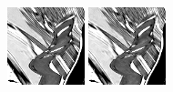 \documentclass[10pt, journal, twocolumn, final, a4paper]{IEEEtran}
\begin{document}
\begin{figure}[thpb!]
\begin{center}
		               \hspace{0.2\textwidth}%
		\includegraphics[width=0.2\textwidth]{figs/temporal_slices/slice_mobile_mono_vnlb_pt4_s10_row220_col040-180_fra080-220_neg-weights.png}%
		\includegraphics[width=0.2\textwidth]{figs/temporal_slices/slice_mobile_mono_vnlb_pt4_s20_row220_col040-180_fra080-220_neg-weights.png}%

\end{center}
\end{figure}
\end{document}
